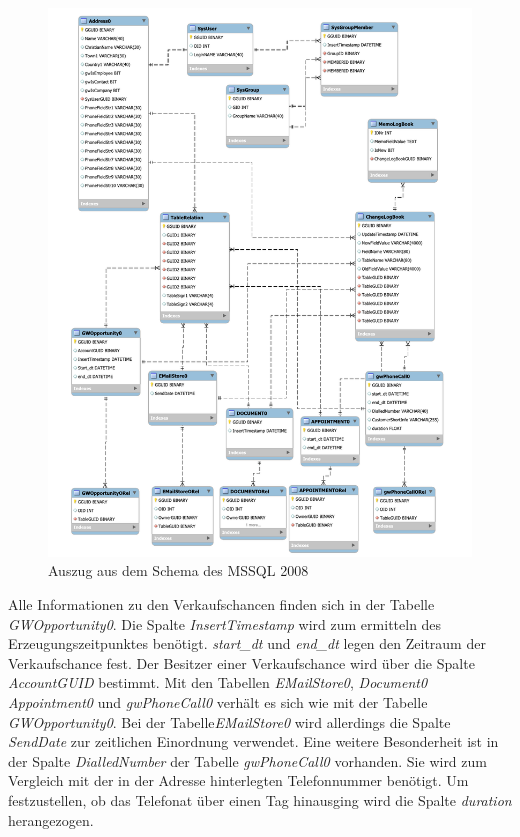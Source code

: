 \begin{figure}[H]
	\centering
  \includegraphics[width=1.0\textwidth]{pics/schema_alt.pdf}
	\caption{Auszug aus dem Schema des MSSQL 2008}
	\label{gw_schema_alt}
\end{figure}

Alle Informationen zu den Verkaufschancen finden sich in der Tabelle \textit{GWOpportunity0}. Die Spalte \textit{InsertTimestamp} wird zum ermitteln des Erzeugungszeitpunktes benötigt. \textit{start\_dt} und \textit{end\_dt} legen den Zeitraum der Verkaufschance fest. Der Besitzer einer Verkaufschance wird über die Spalte \textit{AccountGUID} bestimmt. Mit den Tabellen \textit{EMailStore0}, \textit{Document0} \textit{Appointment0} und \textit{gwPhoneCall0} verhält es sich wie mit der Tabelle \textit{GWOpportunity0}. Bei der Tabelle\textit{EMailStore0} wird allerdings die Spalte \textit{SendDate} zur zeitlichen Einordnung verwendet. Eine weitere Besonderheit ist in der Spalte \textit{DialledNumber} der Tabelle \textit{gwPhoneCall0} vorhanden. Sie wird zum Vergleich mit der in der Adresse hinterlegten Telefonnummer benötigt. Um festzustellen, ob das Telefonat über einen Tag hinausging wird die Spalte \textit{duration} herangezogen.

